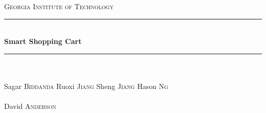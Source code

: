 \documentclass[a4paper,11pt]{report}
\begin{document}
	\begin{titlepage}
		\begin{center}
			\textsc{\LARGE Georgia Institute of Technology}\\[1.5cm]
			\hrule \hspace*{\fill} \\[0.4cm]
			{ \huge \bfseries Smart Shopping Cart}\\[0.4cm]
			\hrule \hspace*{\fill} \\[1.5cm]

			\\
			Sagar \textsc{Biddanda} \hspace{0.5cm} Ruoxi \textsc{Jiang} \hspace{0.5cm} Sheng 
				\textsc{Jiang} \hspace{0.5cm} Hason \textsc{Ng} \\[1cm]

			\\
			David \textsc{Anderson} \\[1cm]

			\date{4 December, 1987}
		\end{center}

	\end{titlepage}

	 \tableofcontents \newpage {}
		
		
		
		
		
		
		
\end{document}

